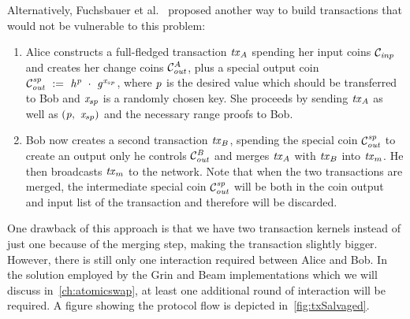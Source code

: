 Alternatively, Fuchsbauer et al.~\cite{fuchsbauer2019aggregate} proposed another way to build transactions that would not be vulnerable to this problem:
\begin{enumerate}
    \item Alice constructs a full-fledged transaction $\mathit{tx}_A$ spending her input coins $\mathcal{C}_{\mathit{inp}}$ and creates her change coins $\mathcal{C}_{\mathit{out}}^A$, plus a special output coin $\mathcal{C}_{\mathit{out}}^{\mathit{sp}} ~:=~ \mathit{h}^{\mathit{p}} ~\cdot~ \mathit{g}^{\mathit{x}_{sp}}$, where $\mathit{p}$ is the desired value which should be transferred to Bob and $\mathit{x}_{sp}$ is a randomly chosen key.
    She proceeds by sending $\mathit{tx}_A$ as well as $(\mathit{p} ,~ \mathit{x}_{sp})$ and the necessary range proofs to Bob.
    \item Bob now creates a second transaction $\mathit{tx}_B$, spending the special coin $\mathcal{C}_{\mathit{out}}^{\mathit{sp}}$ to create an output only he controls $\mathcal{C}_{\mathit{out}}^{\mathit{B}}$ and merges $\mathit{tx}_A$ with $\mathit{tx}_B$ into $\mathit{tx}_m$. He then broadcasts $\mathit{tx}_m$ to the network.
    Note that when the two transactions are merged, the intermediate special coin $\mathcal{C}_{\mathit{out}}^{\mathit{sp}}$ will be both in the coin output and input list of the transaction and therefore will be discarded.
\end{enumerate}
One drawback of this approach is that we have two transaction kernels instead of just one because of the merging step, making the transaction slightly bigger.
However, there is still only one interaction required between Alice and Bob.
In the solution employed by the Grin and Beam implementations which we will discuss in~\cref{ch:atomicswap}, at least one additional round of interaction will be required.
A figure showing the protocol flow is depicted in~\cref{fig:txSalvaged}.

